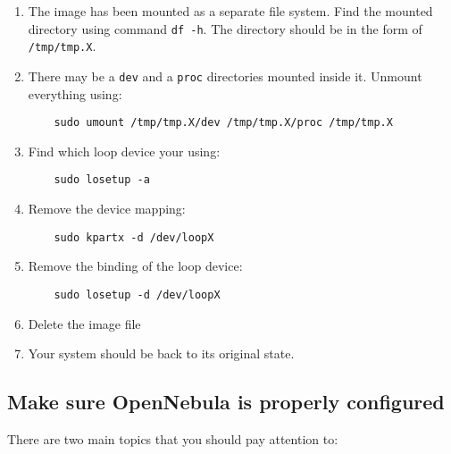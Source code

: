 \documentclass[10pt]{article}
\begin{document}
\begin{enumerate}
\item The image has been mounted as a separate file system. Find the
  mounted directory using command \verb+df -h+. The directory should
  be in the form of \verb+/tmp/tmp.X+.
  
\item There may be a \verb+dev+ and a \verb+proc+ directories mounted
  inside it. Unmount everything using:
  \begin{verbatim}
    sudo umount /tmp/tmp.X/dev /tmp/tmp.X/proc /tmp/tmp.X
  \end{verbatim}
  
\item Find which loop device your using:
  \begin{verbatim}
    sudo losetup -a
  \end{verbatim}
  
\item Remove the device mapping:
  \begin{verbatim}
    sudo kpartx -d /dev/loopX
  \end{verbatim}
  
\item Remove the binding of the loop device:
  \begin{verbatim}
    sudo losetup -d /dev/loopX
  \end{verbatim}

\item Delete the image file 

\item Your system should be back to its original state.
\end{enumerate}

\subsection{Make sure OpenNebula is properly configured}

There are two main topics that you should pay attention to:
\end{document}
